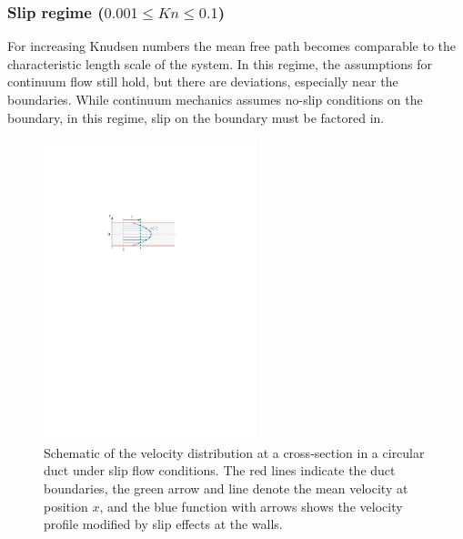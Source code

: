 \subsubsection*{Slip regime (\(0.001 \leq Kn \leq 0.1\))}
	For increasing Knudsen numbers the mean free path becomes comparable to the characteristic length scale of the system.
	In this regime, the assumptions for continuum flow still hold, but there are deviations, especially near the boundaries.
	While continuum mechanics assumes no-slip conditions on the boundary, in this regime, slip on the boundary must be factored in.
	\begin{figure}[H]
	    \centering
	    \includegraphics[width=0.55\textwidth]{src/02_foundations/fig_slip-regime.pdf}
		\caption{
			Schematic of the velocity distribution at a cross-section in a circular duct under slip flow conditions.
			The red lines indicate the duct boundaries, the green arrow and line denote the mean velocity at position $x$, and the blue function with arrows shows the velocity profile modified by slip effects at the walls. \cite{Cengel2017}
		}
		\label{fig:slip-flow}
	\end{figure}

